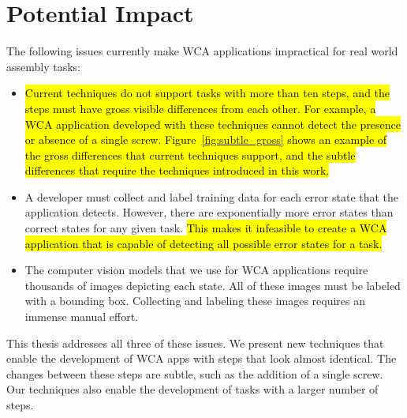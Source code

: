 \section{Potential Impact}

The following issues currently make WCA applications impractical for real world
assembly tasks:
\begin{itemize}
\item \hl{Current techniques do not support tasks with more than ten steps, and the
    steps must have gross visible differences from each other.
    For example, a WCA application developed with these techniques cannot detect
  the presence or absence of a single screw.
  Figure~{\ref{fig:subtle_gross}} shows an example of the gross differences that
  current techniques support, and the subtle differences that require the
  techniques introduced in this work.}
\item A developer must collect and label training data for each error state
  that the application detects.
  However, there are exponentially more error states than correct
  states for any given task.
  \hl{This makes it infeasible to create a WCA application that is capable of
  detecting all possible error states for a task.}
\item The computer vision models that we use for WCA applications require
  thousands of images depicting each state.
  All of these images must be labeled with a bounding box.
  Collecting and labeling these images requires an immense manual effort.
\end{itemize}

This thesis addresses all three of these issues.
We present new techniques that enable the development of WCA apps with steps
that look almost identical.
The changes between these steps are subtle, such as the addition of a single
screw.
Our techniques also enable the development of tasks with a larger number of
steps.

